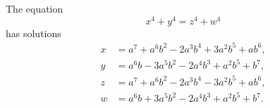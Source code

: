 \begin{proposition}
    The equation
\[
    x^4+y^4=z^4+w^4
\]
    has solutions
\[
\begin{aligned}
x&=a^7+a^6b^2-2a^3b^4+3a^2b^5+ab^6,\\
y&=a^6b-3a^5b^2-2a^4b^3+a^2b^5+b^7,\\
z&=a^7+a^6b^2-2a^3b^4-3a^2b^5+ab^6,\\
w&=a^6b+3a^5b^2-2a^4b^3+a^2b^5+b^7.
\end{aligned}
\]
\end{proposition}
